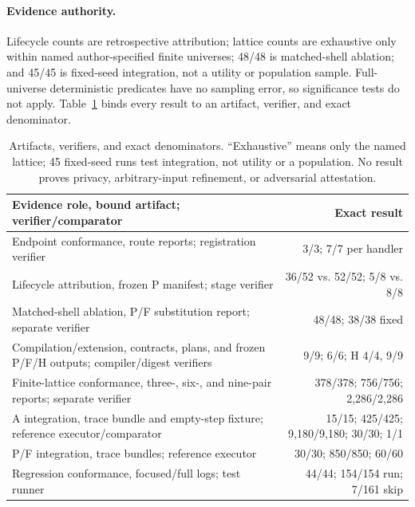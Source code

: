 \documentclass[letterpaper]{article}
\begin{document}
\paragraph{Evidence authority.}
Lifecycle counts are retrospective attribution; lattice counts are exhaustive
only within named author-specified finite universes; 48/48 is matched-shell
ablation; and 45/45 is fixed-seed integration, not a utility or population
sample.  Full-universe deterministic predicates have no sampling error, so
significance tests do not apply.  Table~\ref{tab:v38-conformance} binds every
result to an artifact, verifier, and exact denominator.

\begin{table}[t]
\centering
\small
\setlength{\tabcolsep}{5pt}
\begin{tabular}{@{}p{}r@{}}
\toprule
Evidence role, bound artifact; verifier/comparator & Exact result \\
\midrule
Endpoint conformance, route reports; registration verifier &
3/3; 7/7 per handler \\
Lifecycle attribution, frozen P manifest; stage verifier &
36/52 vs. 52/52; 5/8 vs. 8/8 \\
Matched-shell ablation, P/F substitution report; separate verifier &
48/48; 38/38 fixed \\
Compilation/extension, contracts, plans, and frozen P/F/H outputs;
compiler/digest verifiers & 9/9; 6/6; H 4/4, 9/9 \\
Finite-lattice conformance, three-, six-, and nine-pair reports; separate
verifier & 378/378; 756/756; 2,286/2,286 \\
A integration, trace bundle and empty-step fixture; reference
executor/comparator & 15/15; 425/425; 9,180/9,180; 30/30; 1/1 \\
P/F integration, trace bundles; reference executor &
30/30; 850/850; 60/60 \\
Regression conformance, focused/full logs; test runner &
44/44; 154/154 run; 7/161 skip \\
\bottomrule
\end{tabular}
\caption{Artifacts, verifiers, and exact denominators.  ``Exhaustive'' means
only the named lattice; 45 fixed-seed runs test integration, not utility or a
population.  No result proves privacy, arbitrary-input refinement, or
adversarial attestation.}
\label{tab:v38-conformance}
\end{table}
\end{document}
